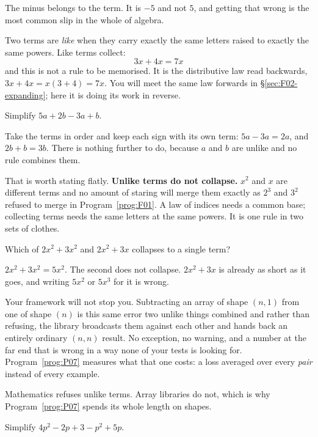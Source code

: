\begin{fr}
The minus belongs to the term. It is $-5$ and not $5$, and getting that wrong
is the most common slip in the whole of algebra.

Two terms are \emph{like} when they carry exactly the same letters raised to
exactly the same powers. Like terms collect:
\[ 3x + 4x = 7x \]
and this is not a rule to be memorised. It is the distributive law read
backwards, $3x + 4x = x(3 + 4) = 7x$. You will meet the same law forwards in
\S\ref{sec:F02-expanding}; here it is doing its work in reverse.

Simplify $5a + 2b - 3a + b$.
\dotline
\nextframe
\end{fr}

\begin{fr}
Take the terms in order and keep each sign with its own term: $5a - 3a = 2a$,
and $2b + b = 3b$. There is nothing further to do, because $a$ and $b$ are
unlike and no rule combines them.

That is worth stating flatly. \textbf{Unlike terms do not collapse.} $x^{2}$
and $x$ are different terms and no amount of staring will merge them \dash{}
exactly as $2^{3}$ and $3^{2}$ refused to merge in
Program~\ref{prog:F01}. A law of indices needs a common base; collecting terms
needs the same letters at the same powers. It is one rule in two sets of
clothes.

Which of $2x^{2} + 3x^{2}$ and $2x^{2} + 3x$ collapses to a single term?
\nextframe
\end{fr}

\begin{fr}
\begin{ansblock}
$2x^{2} + 3x^{2} = 5x^{2}$. The second does not collapse. $2x^{2} + 3x$ is
already as short as it goes, and writing $5x^{2}$ or $5x^{3}$ for it is wrong.
\end{ansblock}

\begin{warning}
Your framework will not stop you. Subtracting an array of shape $(n,1)$ from
one of shape $(n)$ is this same error \dash{} two unlike things combined
\dash{} and rather than refusing, the library broadcasts them against each
other and hands back an entirely ordinary $(n,n)$ result. No exception, no
warning, and a number at the far end that is wrong in a way none of your tests
is looking for. Program~\ref{prog:P07} measures what that one costs: a loss
averaged over every \emph{pair} instead of every example.

Mathematics refuses unlike terms. Array libraries do not, which is why
Program~\ref{prog:P07} spends its whole length on shapes.
\end{warning}

\yourturn
Simplify $4p^{2} - 2p + 3 - p^{2} + 5p$.
\dotline
\nextframe
\end{fr}

